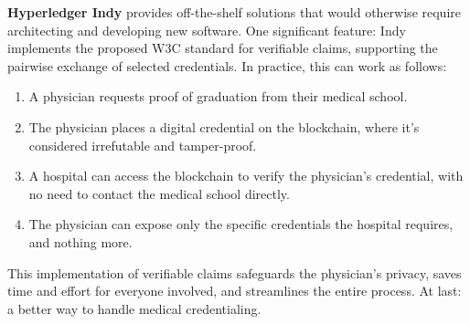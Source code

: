 \textbf{Hyperledger Indy} provides off-the-shelf solutions that would otherwise require architecting and developing new software. 
One significant feature: Indy implements the proposed W3C standard for verifiable claims, supporting the pairwise exchange of selected credentials. In practice, this can work as follows:
\begin{enumerate}
\item A physician requests proof of graduation from their medical school.
\item The physician places a digital credential on the blockchain, where it's considered irrefutable and tamper-proof.
\item A hospital can access the blockchain to verify the physician's credential, with no need to contact the medical school directly. 
\item The physician can expose only the specific credentials the hospital requires, and nothing more. 
\end{enumerate}

This implementation of verifiable claims safeguards the physician's privacy, saves time and effort for everyone involved, and streamlines the entire process. At last: a better way to handle medical credentialing.
